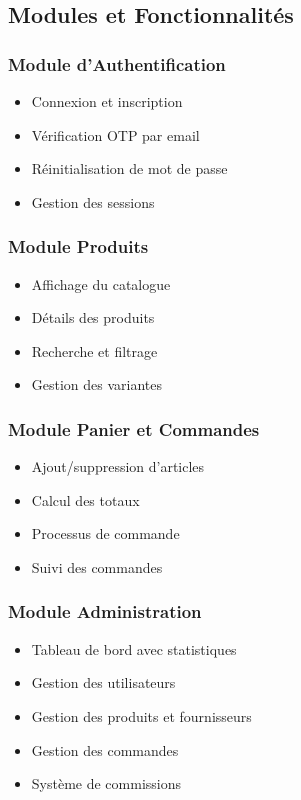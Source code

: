 \documentclass[12pt,a4paper]{report}
\begin{document}
\subsection{Modules et Fonctionnalités}

\subsubsection{Module d'Authentification}
\begin{itemize}
    \item Connexion et inscription
    \item Vérification OTP par email
    \item Réinitialisation de mot de passe
    \item Gestion des sessions
\end{itemize}

\subsubsection{Module Produits}
\begin{itemize}
    \item Affichage du catalogue
    \item Détails des produits
    \item Recherche et filtrage
    \item Gestion des variantes
\end{itemize}

\subsubsection{Module Panier et Commandes}
\begin{itemize}
    \item Ajout/suppression d'articles
    \item Calcul des totaux
    \item Processus de commande
    \item Suivi des commandes
\end{itemize}

\subsubsection{Module Administration}
\begin{itemize}
    \item Tableau de bord avec statistiques
    \item Gestion des utilisateurs
    \item Gestion des produits et fournisseurs
    \item Gestion des commandes
    \item Système de commissions
\end{itemize}
\end{document}

